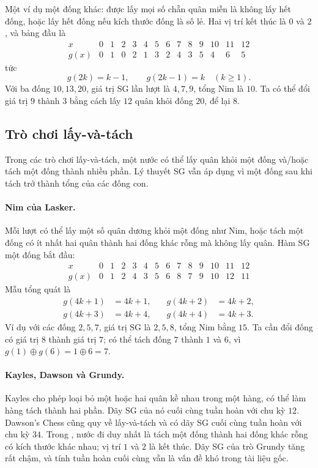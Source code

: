 \documentclass[11pt]{article}
\newcommand{\xor}{\mathbin{\oplus}}
\begin{document}
Một ví dụ một đống khác: được lấy mọi số chẵn quân miễn là không lấy hết đống,
hoặc lấy hết đống nếu kích thước đống là số lẻ. Hai vị trí kết thúc là \(0\)
và \(2\), và bảng đầu là
\[
\begin{array}{c|ccccccccccccc}
x&0&1&2&3&4&5&6&7&8&9&10&11&12\\ \hline
g(x)&0&1&0&2&1&3&2&4&3&5&4&6&5
\end{array}
\]
tức
\[
  g(2k)=k-1,\qquad g(2k-1)=k\quad(k\ge1).
\]
Với ba đống \(10,13,20\), giá trị SG lần lượt là \(4,7,9\), tổng Nim là
\(10\). Ta có thể đổi giá trị \(9\) thành \(3\) bằng cách lấy \(12\) quân khỏi
đống \(20\), để lại \(8\).

\subsection{Trò chơi lấy-và-tách}

Trong các trò chơi lấy-và-tách, một nước có thể lấy quân khỏi một đống và/hoặc
tách một đống thành nhiều phần. Lý thuyết SG vẫn áp dụng vì một đống sau khi
tách trở thành tổng của các đống con.

\paragraph{Nim của Lasker.}
Mỗi lượt có thể lấy một số quân dương khỏi một đống như Nim, hoặc tách một
đống có ít nhất hai quân thành hai đống khác rỗng mà không lấy quân. Hàm SG
một đống bắt đầu:
\[
\begin{array}{c|ccccccccccccc}
x&0&1&2&3&4&5&6&7&8&9&10&11&12\\ \hline
g(x)&0&1&2&4&3&5&6&8&7&9&10&12&11
\end{array}
\]
Mẫu tổng quát là
\[
\begin{aligned}
g(4k+1)&=4k+1,&\quad g(4k+2)&=4k+2,\\
g(4k+3)&=4k+4,&\quad g(4k+4)&=4k+3.
\end{aligned}
\]
Ví dụ với các đống \(2,5,7\), giá trị SG là \(2,5,8\), tổng Nim bằng \(15\).
Ta cần đổi đống có giá trị \(8\) thành giá trị \(7\); có thể tách đống \(7\)
thành \(1\) và \(6\), vì \(g(1)\xor g(6)=1\xor6=7\).

\paragraph{Kayles, Dawson và Grundy.}
Kayles cho phép loại bỏ một hoặc hai quân kề nhau trong một hàng, có thể làm
hàng tách thành hai phần. Dãy SG của nó cuối cùng tuần hoàn với chu kỳ \(12\).
Dawson's Chess cũng quy về lấy-và-tách và có dãy SG cuối cùng tuần hoàn với
chu kỳ \(34\). Trong , nước đi duy nhất là tách một đống
thành hai đống khác rỗng có kích thước khác nhau; vị trí \(1\) và \(2\) là kết
thúc. Dãy SG của trò Grundy tăng rất chậm, và tính tuần hoàn cuối cùng vẫn là
vấn đề khó trong tài liệu gốc.
\end{document}

